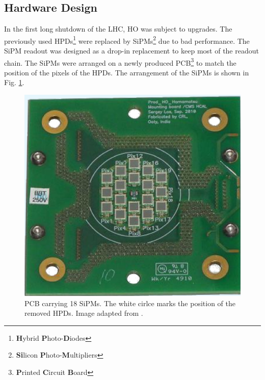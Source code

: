 \subsection{Hardware Design}\label{kuenskenHardwareDesign}
In the first long shutdown of the LHC, HO was subject to upgrades. The previously used HPDs\footnote{{\bf H}ybrid {\bf P}hoto-{\bf D}iodes} were replaced by SiPMs\footnote{{\bf Si}licon {\bf P}hoto-{\bf M}ultipliers} due to bad performance. The SiPM readout was designed as a drop-in replacement to keep most of the readout chain. The SiPMs were arranged on a newly produced PCB\footnote{{\bf P}rinted {\bf C}ircuit {\bf B}oard} to match the position of the pixels of the HPDs. The arrangement of the SiPMs is shown in Fig. \ref{kuenskensipmPcb}.
\begin{figure}[h]
\centering
\begin{minipage}[t]{0.475\textwidth}
\includegraphics[width=\textwidth]{Figures/kuensken/pcbSipm.png}
\caption{PCB carrying 18 SiPMs. The white cirlce marks the position of the removed HPDs. Image adapted from \cite{beniCalor}.}
\label{kuenskensipmPcb}
\end{minipage}
\hspace{1cm}
\begin{minipage}[t]{0.435\textwidth}

\end{minipage}
\end{figure}
